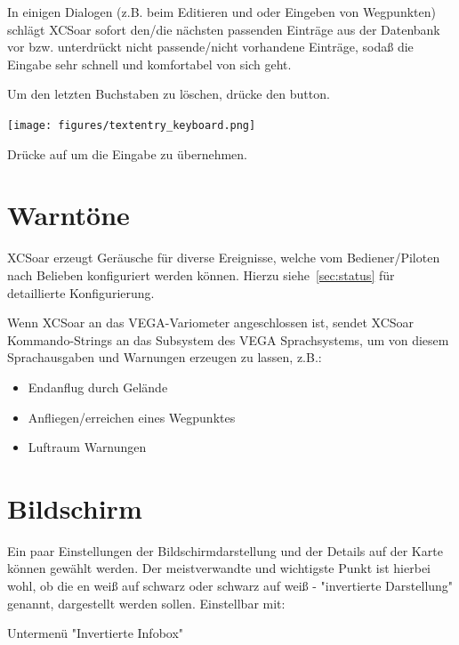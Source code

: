 \blitz In einigen Dialogen (z.B. beim Editieren und oder Eingeben von Wegpunkten) schlägt \textsf{XCSoar} sofort den/die nächsten passenden Einträge aus der Datenbank vor bzw. unterdrückt nicht passende/nicht vorhandene Einträge, sodaß die Eingabe sehr schnell und komfortabel von sich geht.

Um den letzten Buchstaben zu löschen, drücke den  \button{$<-$} button.

\begin{center}
\texttt{[image: figures/textentry\_keyboard.png]}
\end{center}

Drücke auf   um die Eingabe zu übernehmen.

\section{Warntöne}

\textsf{XCSoar} erzeugt Geräusche für diverse Ereignisse, welche vom Bediener/Piloten  nach Belieben konfiguriert werden können.
Hierzu siehe~\ref{sec:status} für detaillierte Konfigurierung.

Wenn \textsf{XCSoar} an das VEGA-Variometer angeschlossen ist,  sendet \textsf{XCSoar} Kommando-Strings an das Subsystem des VEGA Sprachsystems, um von diesem Sprachausgaben und Warnungen erzeugen zu lassen, z.B.:

\begin{itemize}
\item Endanflug durch Gelände
\item Anfliegen/erreichen eines Wegpunktes
\item Luftraum Warnungen
\end{itemize}

\section{Bildschirm}

Ein paar Einstellungen der Bildschirmdarstellung und der Details auf der Karte können gewählt werden.  Der meistverwandte und wichtigste Punkt ist hierbei wohl, ob die {\InfoBox}en weiß auf schwarz oder schwarz auf weiß - "invertierte Darstellung" genannt, dargestellt werden sollen. Einstellbar mit:
\begin{quote}
\blink{}\blink{}
\end{quote}  Untermenü "Invertierte Infobox"

